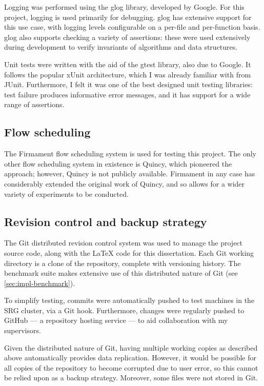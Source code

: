 Logging was performed using the glog library, developed by Google. For this project, logging is used primarily for debugging. glog has extensive support for this use case, with logging levels configurable on a per-file and per-function basis. glog also supports checking a variety of assertions: these were used extensively during development to verify invariants of algorithms and data structures.

Unit tests were written with the aid of the gtest library, also due to Google. It follows the popular xUnit architecture, which I was already familiar with from JUnit. Furthermore, I felt it was one of the best designed unit testing libraries: test failure produces informative error messages, and it has support for a wide range of assertions.

\subsection{Flow scheduling}

The Firmament flow scheduling system is used for testing this project. The only other flow scheduling system in existence is Quincy, which pioneered the approach; however, Quincy is not publicly available. Firmament in any case has considerably extended the original work of Quincy, and so allows for a wider variety of experiments to be conducted.

\subsection{Revision control and backup strategy}

The Git distributed revision control system was used to manage the project source code, along with the {\LaTeX} code for this dissertation. Each Git working directory is a clone of the repository, complete with versioning history. The benchmark suite makes extensive use of this distributed nature of Git (see \cref{sec:impl-benchmark}).


To simplify testing, commits were automatically pushed to test machines in the SRG cluster, via a Git hook. Furthermore, changes were regularly pushed to GitHub --- a repository hosting service --- to aid collaboration with my supervisors. 

Given the distributed nature of Git, having multiple working copies as described above automatically provides data replication. However, it would be possible for all copies of the repository to become corrupted due to user error, so this cannot be relied upon as a backup strategy. Moreover, some files were not stored in Git\footnotemark.


